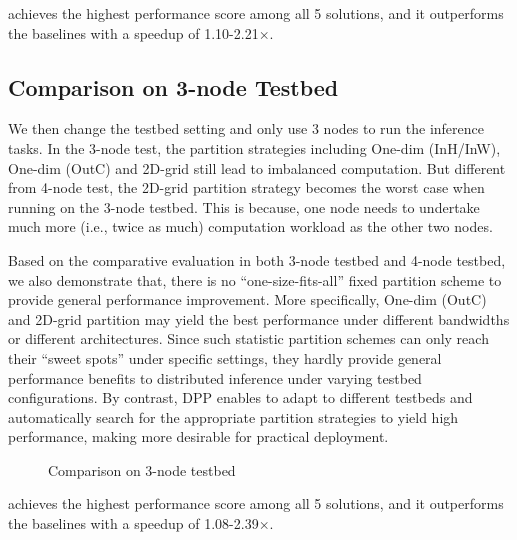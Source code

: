  \sysname achieves the highest performance score among all 5 solutions, and it outperforms the baselines with a speedup of 1.10-2.21$\times$. 


\subsection{Comparison on 3-node Testbed}
\label{3node}


We then change the testbed setting and only use 3 nodes to run the inference tasks. In the 3-node test, the partition strategies including One-dim (InH/InW), One-dim (OutC) and 2D-grid still lead to imbalanced computation. But different from 4-node test,  the 2D-grid partition strategy becomes the worst case when running on the 3-node testbed. This is because, one node needs to undertake much more (i.e., twice as much) computation workload as the other two nodes. 


Based on the comparative evaluation in both 3-node testbed and 4-node testbed, we also demonstrate that, there is no ``one-size-fits-all'' fixed partition scheme to provide general performance improvement. More specifically, One-dim (OutC) and 2D-grid partition may yield the best performance under different bandwidths or different architectures. Since such statistic partition schemes can only reach their ``sweet spots'' under specific settings, they hardly provide general performance benefits to distributed inference under varying testbed configurations. By contrast, DPP enables \sysname to adapt to different testbeds and automatically search for the appropriate partition strategies to yield high performance, making \sysname more desirable for practical deployment. 

\begin{figure*}[!t]
	\centering
	\caption{Comparison on 3-node testbed}
	\label{Ring-3-node} 
\end{figure*}


 \sysname achieves the highest performance score among all 5 solutions, and it outperforms the baselines with a speedup of 1.08-2.39$\times$. 



